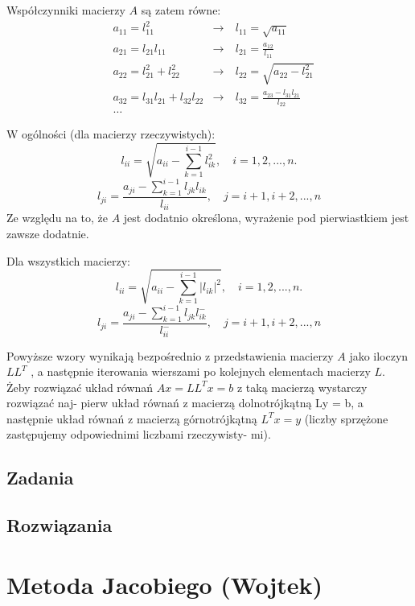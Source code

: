 \documentclass[a4paper]{article}
\begin{document}
Współczynniki macierzy $A$ są zatem równe:
\begin{align}
& a_{11} = l_{11}^2 & \rightarrow\ & l_{11} = \sqrt{a_{11}}\\
& a_{21} = l_{21}l_{11} & \rightarrow\ & l_{21} = \frac{a_{12}}{l_{11}}\\
& a_{22} = l_{21}^2+l_{22}^2 & \rightarrow\ & l_{22} = \sqrt{a_{22}-l_{21}^2}\\
& a_{32} = l_{31}l_{21} + l_{32}l_{22} & \rightarrow\ & l_{32} = \frac{a_{23} - l_{31}l_{21}}{l_{22}}\\
&\dots\end{align}



W ogólności (dla macierzy rzeczywistych):
$$l_{ii} = \sqrt{ a_{ii} - \sum_{k=1}^{i-1}l^2_{ik}}, \quad i=1,2,...,n.$$
$$l_{ji} = \frac{a_{ji} - \sum_{k=1}^{i-1}l_{jk}l_{ik}}{l_{ii}}, \quad j= i+1, i+2, ...,n$$
Ze względu na to, że $A$ jest dodatnio określona, wyrażenie pod pierwiastkiem jest zawsze dodatnie.
\newline \newline

Dla wszystkich macierzy:
$$l_{ii} = \sqrt{ a_{ii} - \sum_{k=1}^{i-1}|l_{ik}|^2}, \quad i=1,2,...,n.$$
$$l_{ji} = \frac{a_{ji} - \sum_{k=1}^{i-1}l_{jk}l_{ik}^-}{l_{ii}^-}, \quad j= i+1, i+2, ...,n$$



Powyższe wzory wynikają bezpośrednio z przedstawienia macierzy $A$ jako iloczyn $LL^T$ , a
następnie iterowania wierszami po kolejnych elementach macierzy $L$.
Żeby rozwiązać układ równań $Ax = LL^T x = b$ z taką macierzą wystarczy rozwiązać naj-
pierw układ równań z macierzą dolnotrójkątną Ly = b, a następnie układ równań z macierzą
górnotrójkątną $L^T x = y$ (liczby sprzężone zastępujemy odpowiednimi liczbami rzeczywisty-
mi).


\subsection{Zadania}

\subsection{Rozwiązania}

\section{Metoda Jacobiego (Wojtek)}
\end{document}
